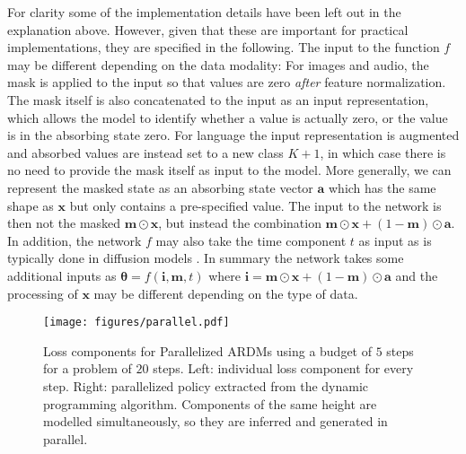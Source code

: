 \documentclass{article} \usepackage{iclr2022_conference,times}
\def\va{{\bm{a}}}
\def\vi{{\bm{i}}}
\def\vm{{\bm{m}}}
\def\vx{{\bm{x}}}
\begin{document}
For clarity some of the implementation details have been left out in the explanation above. However, given that these are important for practical implementations, they are specified in the following. The input to the function $f$ may be different depending on the data modality: For images and audio, the mask is applied to the input so that values are zero \textit{after} feature normalization. The mask itself is also concatenated to the input as an input representation, which allows the model to identify whether a value is actually zero, or the value is in the absorbing state zero. For language the input representation is augmented and absorbed values are instead set to a new class $K + 1$, in which case there is no need to provide the mask itself as input to the model. More generally, we can represent the masked state as an absorbing state vector $\va$ which has the same shape as $\vx$ but only contains a pre-specified value. The input to the network is then not the masked $\vm \odot \vx$, but instead the combination $\vm \odot \vx + (1 - \vm) \odot \va$. In addition, the network $f$ may also take the time component $t$ as input as is typically done in diffusion models \citep{ho2020denoising}. In summary the network takes some additional inputs as $\boldsymbol{\theta} = f(\vi, \vm, t)$ where $\vi = \vm \odot \vx + (1 - \vm) \odot \va$ and the processing of $\vx$ may be different depending on the type of data.

\begin{figure}[b]
    \vspace{-.1cm}
    \centering
    \texttt{[image: figures/parallel.pdf]}
    \vspace{-.2cm}
    \caption{Loss components for Parallelized ARDMs using a budget of $5$ steps for a problem of $20$ steps. Left: individual loss component for every step. Right: parallelized policy extracted from the dynamic programming algorithm. Components of the same height are modelled simultaneously, so they are inferred and generated in parallel.}
    \label{fig:parallel_l_t}
    \vspace{-.3cm}
\end{figure}
\end{document}
